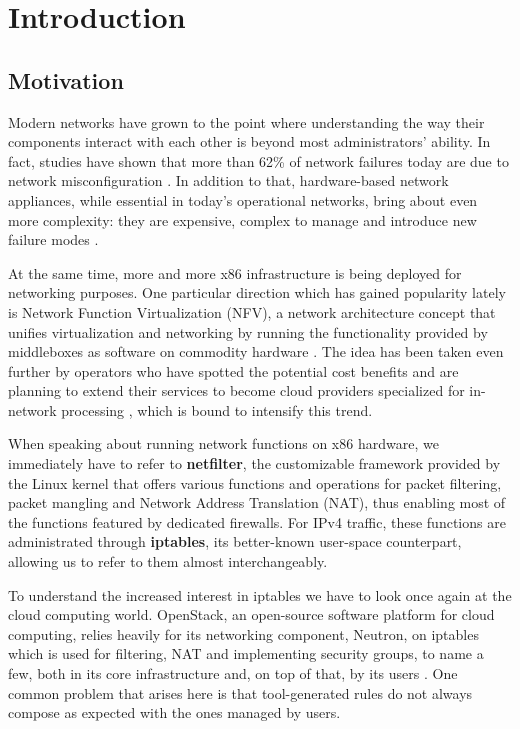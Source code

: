 \chapter{Introduction}

\section{Motivation}

Modern networks have grown to the point where understanding the way their
components interact with each other is beyond most administrators' ability. In
fact, studies have shown that more than 62\% of network failures today are due
to network misconfiguration \cite{alimi2008shadow}.  In addition to that,
hardware-based network appliances, while essential in today's operational
networks, bring about even more complexity: they are expensive, complex to
manage and introduce new failure modes \cite{sherry2012making}.

At the same time, more and more x86 infrastructure is being deployed for
networking purposes. One particular direction which has gained popularity lately
is Network Function Virtualization (NFV), a network architecture concept that unifies virtualization and
networking by running the functionality provided by middleboxes as software on
commodity hardware \cite{martins2014clickos, stoenescu2015net}. The idea has
been taken even further by operators who have spotted the potential cost
benefits and are planning to extend their services to become cloud providers
specialized for in-network processing \cite{stoenescu2015net}, which is bound
to intensify this trend.

When speaking about running network functions on x86 hardware, we immediately
have to refer to \textbf{netfilter}, the customizable framework provided by the
Linux kernel that offers various functions and operations for packet filtering,
packet mangling and Network Address Translation (NAT), thus enabling most of the functions featured by dedicated
firewalls. For IPv4 traffic, these functions are administrated through
\textbf{iptables}, its better-known user-space counterpart, allowing us to
refer to them almost interchangeably.

To understand the increased interest in iptables we have to look once again at
the cloud computing world.  OpenStack, an open-source software platform for
cloud computing, relies heavily for its networking component, Neutron, on
iptables which is used for filtering, NAT and implementing security groups, to
name a few, both in its core infrastructure and, on top of that, by its users
\cite{denton2014learning}.  One common problem that arises here is that
tool-generated rules do not always compose as expected with the ones managed by
users.


